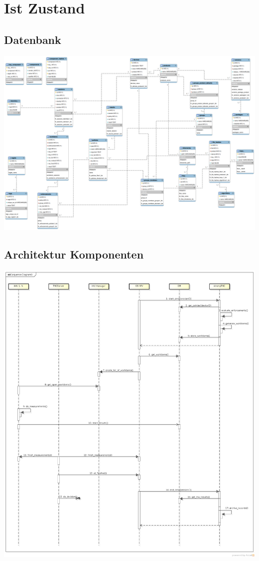 \chapter{Ist Zustand}
\section{Datenbank}
\includegraphics[scale=0.25, angle=90]{images/db/database-2014-03-12.png}
\section{Architektur Komponenten}
\includegraphics[width=\textwidth]{images/architecture/architecture_sequence_diagramm-2014-03-12}
